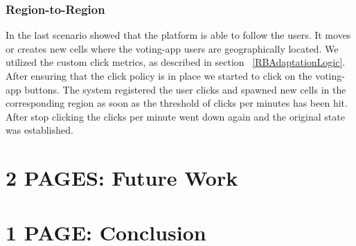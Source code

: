 \documentclass{seal_thesis}
\begin{document}
\subsection{Region-to-Region}
In the last scenario showed that the platform is able to follow the users.
It moves or creates new cells where the voting-app users are geographically located.
We utilized the custom click metrics, as described in section ~\ref{RBAdaptationLogic}.
After ensuring that the click policy is in place we started to click on the voting-app buttons.
The system registered the user clicks and spawned new cells in the corresponding region as soon as the threshold of clicks per minutes has been hit.
After stop clicking the clicks per minute went down again and the original state was established.


\chapter{2 PAGES: Future Work}\label{ch:futurework}



\chapter{1 PAGE: Conclusion}\label{ch:conclusion}





\end{document}
